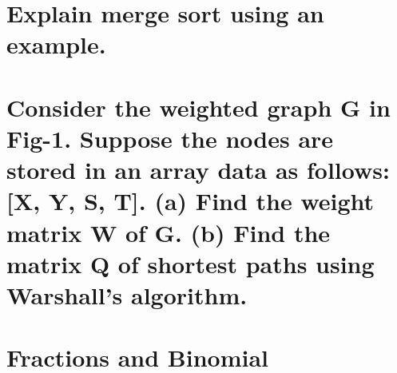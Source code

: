 \documentclass[11 pt]{article}
\begin{document}
\pagebreak

\section{Explain merge sort using an example.}


\pagebreak

\section{Consider the weighted graph G in Fig-1. Suppose the nodes are stored in an array data as follows: [X, Y, S, T]. (a) Find the weight matrix W of G. (b) Find the matrix Q of shortest paths using Warshall's algorithm.}


\section{Fractions and Binomial}


\pagebreak
\printindex

\pagebreak


\end{document}
